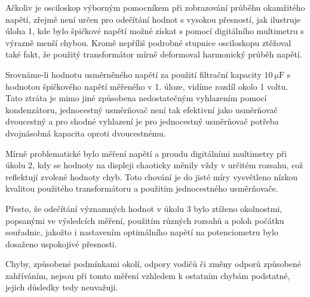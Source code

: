 \documentclass[0-protokol.tex]{subfiles}
\begin{document}
Ačkoliv je osciloskop výborným pomocníkem při zobrazování průběhu okamžitého napětí, zřejmě není určen pro odečítání hodnot s vysokou přesností, jak ilustruje úloha 1, kde bylo špičkové napětí možné získat s pomocí digitálního multimetru s výrazně menší chybou. Kromě nepříliš podrobné stupnice osciloskopu ztěžoval také fakt, že použitý transformátor mírně deformoval harmonický průběh napětí.

Srovnáme-li hodnotu usměrněného napětí za použití filtrační kapacity $\SI{10}{\micro\farad}$ s hodnotou špičkového napětí měřeného v 1. úloze, vidíme rozdíl okolo 1 voltu. Tato ztráta je mimo jiné způsobena nedostatečným vyhlazením pomocí kondenzátoru, jednocestný usměrňovač není tak efektivní jako usměrňovač dvoucestný a pro shodné vyhlazení je pro jednocestný usměrňovač potřeba dvojnásobná kapacita oproti dvoucestnému.

Mírně problematické bylo měření napětí a proudu digitálními multimetry při úkolu 2, kdy se hodnoty na displeji chaoticky měnily vždy v určitém rozsahu, což reflektují zvolené hodnoty chyb. Toto chování je do jisté míry vysvětleno nízkou kvalitou použitého transformátoru a použitím jednocestného usměrňovače.

Přesto, že odečítání významných hodnot v úkolu 3 bylo ztíženo okolnostmi, popsanými ve výsledcích měření, použitím různých rozsahů a poloh počátku souřadnic, jakožto i nastavením optimálního napětí na potenciometru bylo dosaženo uspokojivé přesnosti.

Chyby, způsobené podmínkami okolí, odpory vodičů či změny odporů způsobené zahříváním, nejsou při tomto měření vzhledem k ostatním chybám podstatné, jejich důsledky tedy neuvažuji.
\end{document}

